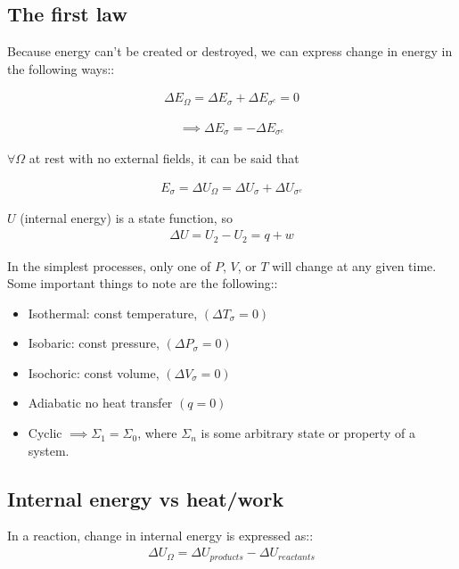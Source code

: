 \documentclass[12pt]{article}
\begin{document}
\subsection*{The first law}

Because energy can't be created or destroyed, we can express change in energy in the following ways::

\begin{align*}
    \Delta E_{\Omega}=\Delta E_{\sigma}+\Delta E_{\sigma^c}=0
\end{align*}

\begin{align*}
    \implies\Delta E_{\sigma}=-\Delta E_{\sigma^c}
\end{align*}

$\forall\Omega$ at rest with no external fields, it can be said that

\begin{align*}
    E_{\sigma}=
    \Delta U_{\Omega}=\Delta U_{\sigma}+\Delta U_{\sigma^c}
\end{align*}

$U$ (internal energy) is a state function, so \begin{align*}\Delta U=U_2-U_2=q+w\end{align*}

In the simplest processes, only one of $P$, $V$, or $T$ will change at any given time. Some important things to note are the following::

\begin{itemize}
    \item Isothermal: const temperature, $(\Delta T_\sigma=0)$
    \item Isobaric: const pressure, $(\Delta P_\sigma=0)$
    \item Isochoric: const volume, $(\Delta V_\sigma=0)$
    \item Adiabatic no heat transfer $(q=0)$
    \item Cyclic $\implies \Sigma_1=\Sigma_0$, where $\Sigma_n$ is some arbitrary state or property of a system.
\end{itemize}

\subsection*{Internal energy vs heat/work}
In a reaction, change in internal energy is expressed as::
\begin{align*}
    \Delta U_{\Omega}=\Delta U_{products}-\Delta U_{reactants}
\end{align*}
\end{document}
